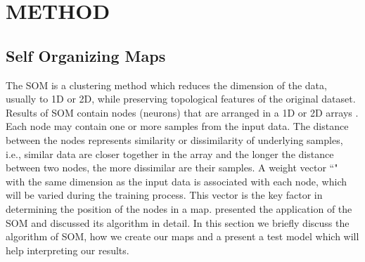 
\section{METHOD}
\label{sec: method}
 \subsection{Self Organizing Maps}
 \label{sec: som}
 
 The SOM is a clustering method which reduces the dimension of the data, usually to 1D or 2D, while preserving topological features of the original dataset.
 Results of SOM contain nodes (neurons) that are arranged in a 1D or 2D arrays \citep{Kohonen98}. 
 Each node may contain one or more samples from the input data.
 The distance between the nodes represents similarity or dissimilarity of underlying samples, i.e., similar data are closer together in the array and the longer the distance between two nodes, the more dissimilar are their samples.
 A weight vector ``" with the same dimension as the input data is associated with each node, which will be varied during the training process.
 This vector is the key factor in determining the position of the nodes in a map.
 \cite{Geach12} presented the application of the SOM and discussed its algorithm in detail.
 In this section we briefly discuss the algorithm of SOM, how we create our maps and a present a  test model which will help interpreting our results. 
 
